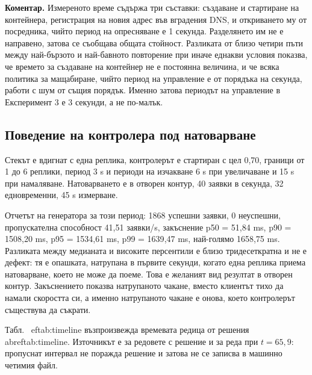 \textbf{Коментар.} Измереното време съдържа три съставки: създаване и стартиране на
контейнера, регистрация на новия адрес във вградения DNS, и откриването му от посредника,
чийто период на опресняване е 1 секунда. Разделянето им не е направено, затова се
съобщава общата стойност. Разликата от близо четири пъти между най-бързото и най-бавното
повторение при иначе еднакви условия показва, че времето за създаване на контейнер не е
постоянна величина, и че всяка политика за мащабиране, чийто период на управление е от
порядъка на секунда, работи с шум от същия порядък. Именно затова периодът на управление
в Експеримент 3 е 3 секунди, а не по-малък.

\subsection{Поведение на контролера под натоварване}

Стекът е вдигнат с една реплика, контролерът е стартиран с цел 0{,}70, граници от 1 до 6
реплики, период 3 s и периоди на изчакване 6 s при увеличаване и 15 s при намаляване.
Натоварването е в отворен контур, 40 заявки в секунда, 32 едновременни, 45 s измерване.

Отчетът на генератора за този период: 1868 успешни заявки, 0 неуспешни, пропускателна
способност 41{,}51 заявки/s, закъснение p50 = 51{,}84 ms, p90 = 1508{,}20 ms,
p95 = 1534{,}61 ms, p99 = 1639{,}47 ms, най-голямо 1658{,}75 ms. Разликата между медианата
и високите персентили е близо тридесеткратна и не е дефект: тя е опашката, натрупана в
първите секунди, когато една реплика приема натоварване, което не може да поеме. Това е
желаният вид резултат в отворен контур. Закъснението показва натрупаното чакане, вместо
клиентът тихо да намали скоростта си, а именно натрупаното чакане е онова, което
контролерът съществува да съкрати.

Табл.~
ef{tab:timeline} възпроизвежда времевата редица от решения 	abref{tab:timeline}.
Източникът е  за редовете с решение и
 за реда при $t = 65{,}9$: пропуснат интервал не поражда
решение и затова не се записва в машинно четимия файл.

